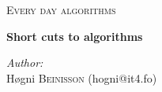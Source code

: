 \documentclass[12pt,a4paper]{article}
\author{Høgni Beinisson}
\begin{document}
\begin{titlepage}

\newcommand{\HRule}{\rule{\linewidth}{0.5mm}} %

\center %
 

\textsc{\LARGE Every day algorithms}\\[1.5cm] %
\hfill \break

{ \huge \bfseries Short cuts to algorithms}\\[0.4cm] %
\hfill \break

\begin{minipage}{0.4\textwidth}
\begin{flushleft} \large
\emph{Author:}\\
Høgni \textsc{Beinisson} (hogni@it4.fo)\\
\end{flushleft}
\end{minipage}
~
\begin{minipage}{0.4\textwidth}
\begin{flushright} \large

\end{flushright}
\end{minipage}\\[4cm]





\end{titlepage}
\end{document}
